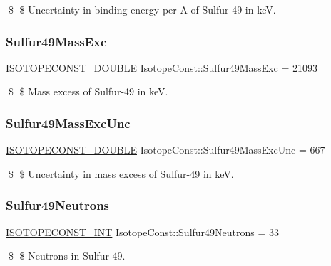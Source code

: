 \$ \$ Uncertainty in binding energy per A of Sulfur-\/49 in keV. \mbox{\label{group___isotope_const-_sulfur-_s49_ga73a86e7005041c0e1453f3046f4e11c5}} 
\subsubsection{\texorpdfstring{Sulfur49\+Mass\+Exc}{Sulfur49MassExc}}
{\footnotesize\ttfamily \mbox{\hyperlink{group___isotope_const-_macros_ga8f45a7272ce02c0b4c65c44636ed719a}{I\+S\+O\+T\+O\+P\+E\+C\+O\+N\+S\+T\+\_\+\+D\+O\+U\+B\+LE}} Isotope\+Const\+::\+Sulfur49\+Mass\+Exc = 21093}

\$ \$ Mass excess of Sulfur-\/49 in keV. \mbox{\label{group___isotope_const-_sulfur-_s49_gafeb36e5348d017eb82d853079950d41d}} 
\subsubsection{\texorpdfstring{Sulfur49\+Mass\+Exc\+Unc}{Sulfur49MassExcUnc}}
{\footnotesize\ttfamily \mbox{\hyperlink{group___isotope_const-_macros_ga8f45a7272ce02c0b4c65c44636ed719a}{I\+S\+O\+T\+O\+P\+E\+C\+O\+N\+S\+T\+\_\+\+D\+O\+U\+B\+LE}} Isotope\+Const\+::\+Sulfur49\+Mass\+Exc\+Unc = 667}

\$ \$ Uncertainty in mass excess of Sulfur-\/49 in keV. \mbox{\label{group___isotope_const-_sulfur-_s49_ga5979ff15be6582286ef1c0ffa66f0366}} 
\subsubsection{\texorpdfstring{Sulfur49\+Neutrons}{Sulfur49Neutrons}}
{\footnotesize\ttfamily \mbox{\hyperlink{group___isotope_const-_macros_ga5f18360b3e99483a35c32d789e62621c}{I\+S\+O\+T\+O\+P\+E\+C\+O\+N\+S\+T\+\_\+\+I\+NT}} Isotope\+Const\+::\+Sulfur49\+Neutrons = 33}

\$ \$ Neutrons in Sulfur-\/49. \mbox{\label{group___isotope_const-_sulfur-_s49_ga7f33f20336454bc312801eb6da73cb18}} 
